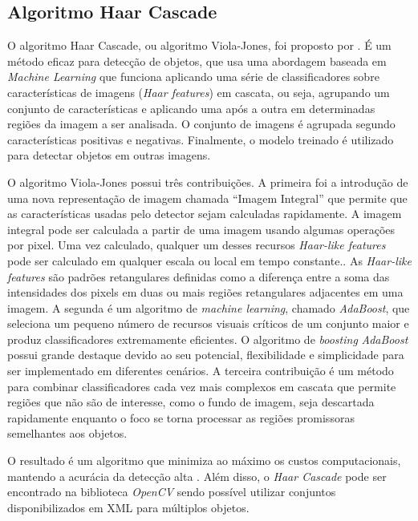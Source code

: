 \subsection{Algoritmo Haar Cascade}
O algoritmo Haar Cascade, ou algoritmo Viola-Jones, foi proposto por \cite{Viola-Jones}. É um método eficaz para detecção de objetos, que usa uma abordagem baseada em \textit{Machine Learning} que funciona aplicando uma série de classificadores sobre características de imagens (\textit{Haar features}) em cascata, ou seja, agrupando um conjunto de características e aplicando uma após a outra em determinadas regiões da imagem a ser analisada. O conjunto de imagens é agrupada segundo características positivas e negativas. Finalmente, o modelo treinado é utilizado para detectar objetos em outras imagens.

O algoritmo Viola-Jones possui três contribuições. A primeira foi a introdução de uma nova representação de imagem chamada “Imagem Integral” que permite que as características usadas pelo detector sejam calculadas rapidamente. A imagem integral pode ser calculada a partir de uma imagem usando algumas operações por pixel. Uma vez calculado, qualquer um desses recursos \textit{Haar-like features} pode ser calculado em qualquer escala ou local em tempo constante.\cite{Viola-Jones}. As \textit{Haar-like features} são padrões retangulares definidas como a diferença entre a soma das intensidades dos pixels em duas ou mais regiões retangulares adjacentes em uma imagem. 
A segunda é um algoritmo de \textit{machine learning}, chamado \textit{AdaBoost}, que seleciona um pequeno número de recursos visuais críticos de um conjunto maior e produz classificadores extremamente eficientes. O algoritmo de \textit{boosting} \textit{AdaBoost} possui grande destaque devido ao seu potencial, flexibilidade e simplicidade para ser implementado em diferentes cenários. A terceira contribuição é um método para combinar classificadores cada vez mais complexos em cascata que permite regiões que não são de interesse, como o fundo de imagem, seja descartada rapidamente enquanto o foco se torna processar as regiões promissoras semelhantes aos objetos.

O resultado é um algoritmo que minimiza ao máximo os custos computacionais, mantendo a acurácia da detecção alta \cite{Viola-Jones}. Além disso, o \textit{Haar Cascade} pode ser encontrado
na biblioteca \textit{OpenCV} sendo possível utilizar conjuntos disponibilizados em XML para múltiplos objetos.

